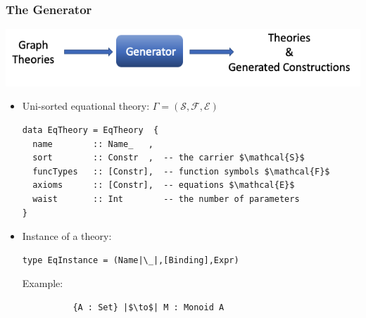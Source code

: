 \documentclass[t,10pt,numbers,fleqn,usenames,xcolor=dvipsnames]{beamer}
\begin{document}
\begin{frame}[fragile]
\frametitle{The Generator}
\begin{center}
\includegraphics[scale=0.25]{figures/generator.png}
\end{center}
\pause
\begin{itemize}
\item Uni-sorted equational theory: 
$\Gamma = (\mathcal{S},\mathcal{F},\mathcal{E})$
\vspace{0.2cm}
\begin{verbatim}
data EqTheory = EqTheory  {
  name        :: Name_   ,
  sort        :: Constr  ,  -- the carrier $\mathcal{S}$
  funcTypes   :: [Constr],  -- function symbols $\mathcal{F}$
  axioms      :: [Constr],  -- equations $\mathcal{E}$
  waist       :: Int        -- the number of parameters
}  
\end{verbatim}

\pause
\item Instance of a theory:  
\begin{verbatim}
type EqInstance = (Name|\_|,[Binding],Expr) 
\end{verbatim}
\scriptsize{Example:} 
\begin{verbatim}
          {A : Set} |$\to$| M : Monoid A   
\end{verbatim}
\end{itemize}
%


\end{frame}
\end{document}
